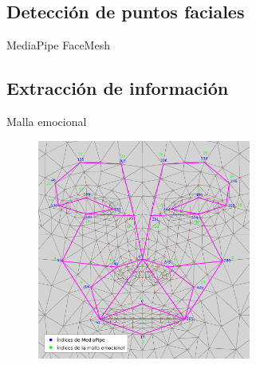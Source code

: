 \documentclass{beamer}
\begin{document}
\subsection{Detección de puntos faciales}
\begin{frame}{MediaPipe FaceMesh}
\begin{figure}
  \begin{center}
  \end{center}
\end{figure}
\end{frame}

\subsection{Extracción de información}
\begin{frame}{Malla emocional}
\begin{figure}
    \begin{center}
        \includegraphics[width=7cm]{figs/emotional_mesh.png}
    \end{center}
\end{figure}
\end{frame}
\end{document}
